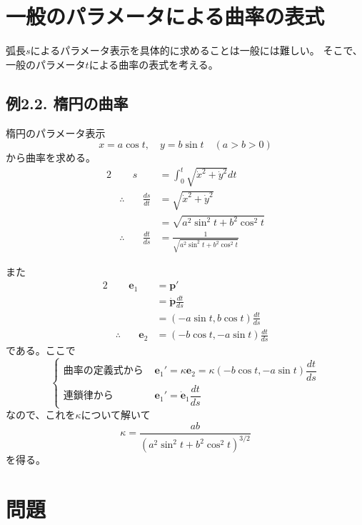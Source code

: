 \documentclass[a4j,disablejfam,dvipdfmx,papersize,slide,uplatex,21pt]{jsarticle}
\begin{document}
\section{一般のパラメータによる曲率の表式}
弧長$s$によるパラメータ表示を具体的に求めることは一般には難しい。
そこで、一般のパラメータ$t$による曲率の表式を考える。

\newpage
\subsection*{例2.2. 楕円の曲率}
楕円のパラメータ表示
\begin{equation}
    x = a \cos t,\quad y = b \sin t \quad (a > b > 0)
\end{equation}
から曲率を求める。
\begin{alignat}{2}
    &&s &= \int_0^t \sqrt{\dot{x}^2 + \dot{y}^2} dt \\
    &\therefore& \quad \frac{ds}{dt} &= \sqrt{\dot{x}^2 + \dot{y}^2} \\
        &&&= \sqrt{a^2 \sin^2 t + b^2 \cos^2 t} \\
    &\therefore& \quad \frac{dt}{ds} &= \frac{1}{\sqrt{a^2 \sin^2 t + b^2 \cos^2 t}}
\end{alignat}

\newpage
また
\begin{alignat}{2}
    &&\bm{e}_1 &= \bm{p}' \\
        &&&= \dot{\bm{p}} \frac{dt}{ds} \\
        &&&= (-a \sin t, b \cos t) \frac{dt}{ds} \\
    &\therefore& \quad \bm{e}_2 &= (-b \cos t, -a \sin t) \frac{dt}{ds}
\end{alignat}
である。ここで
\begin{equation}
    \begin{cases}
        \text{曲率の定義式から } &\bm{e}_1' = \kappa \bm{e}_2 = \kappa (-b \cos t, -a \sin t) \dfrac{dt}{ds} \\
        \text{連鎖律から } &\bm{e}_1' = \dot{\bm{e}}_1 \dfrac{dt}{ds}
    \end{cases}
\end{equation}
なので、これを$\kappa$について解いて
\begin{equation}
    \kappa = \frac{ab}{(a^2 \sin^2 t + b^2 \cos^2 t)^{3/2}}
\end{equation}
を得る。




\section{問題}
\end{document}
